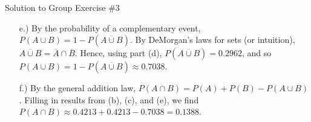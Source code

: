 \documentclass[10pt]{beamer}
\begin{document}
\begin{frame}{Solution to Group Exercise \#3}
\begin{itemize}
\item[e.)] By the probability of a complementary event, $P(A \cup B) =  1- P(\overline{A \cup B})$.   By DeMorgan's laws for sets (or intuition), $\overline{A \cup B}  = \overline{A} \cap \overline{B}$. Hence, using part (d), $P(\overline{A \cup B}) = 0.2962$, and so $P(A \cup B) =  1- P(\overline{A \cup B}) \approx 0.7038$.
\item[f.)] By the general addition law, $P(A \cap B) = P(A) + P(B) - P(A \cup B)$. Filling in results from (b), (c), and (e), we find $P(A \cap B) \approx 0.4213 + 0.4213 - 0.7038 = 0.1388$. 
 \end{itemize} 

\end{frame}
\end{document}
